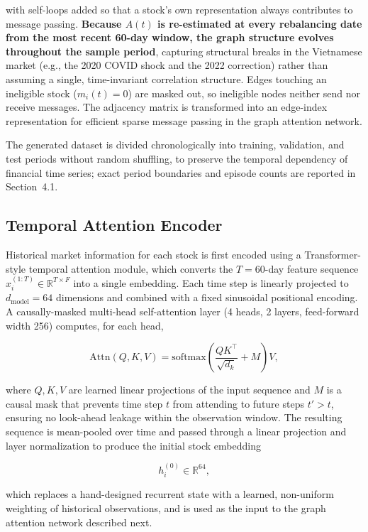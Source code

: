 \documentclass[runningheads]{llncs}
\begin{document}
with self-loops added so that a stock's own representation always contributes to message passing. \textbf{Because $A(t)$ is re-estimated at every rebalancing date from the most recent 60-day window, the graph structure evolves throughout the sample period}, capturing structural breaks in the Vietnamese market (e.g., the 2020 COVID shock and the 2022 correction) rather than assuming a single, time-invariant correlation structure. Edges touching an ineligible stock ($m_i(t)=0$) are masked out, so ineligible nodes neither send nor receive messages. The adjacency matrix is transformed into an edge-index representation for efficient sparse message passing in the graph attention network.

The generated dataset is divided chronologically into training, validation, and test periods without random shuffling, to preserve the temporal dependency of financial time series; exact period boundaries and episode counts are reported in Section~4.1.

\subsection{Temporal Attention Encoder}

Historical market information for each stock is first encoded using a Transformer-style temporal attention module, which converts the $T=60$-day feature sequence $x_i^{(1:T)}\in\mathbb{R}^{T\times F}$ into a single embedding. Each time step is linearly projected to $d_{\mathrm{model}}=64$ dimensions and combined with a fixed sinusoidal positional encoding. A causally-masked multi-head self-attention layer (4 heads, 2 layers, feed-forward width 256) computes, for each head,

\[
\mathrm{Attn}(Q,K,V)
=
\mathrm{softmax}\!\left(\frac{QK^{\top}}{\sqrt{d_k}}+M\right)V,
\]

where $Q,K,V$ are learned linear projections of the input sequence and $M$ is a causal mask that prevents time step $t$ from attending to future steps $t'>t$, ensuring no look-ahead leakage within the observation window. The resulting sequence is mean-pooled over time and passed through a linear projection and layer normalization to produce the initial stock embedding

\[
h_i^{(0)} \in \mathbb{R}^{64},
\]

which replaces a hand-designed recurrent state with a learned, non-uniform weighting of historical observations, and is used as the input to the graph attention network described next.
\end{document}
